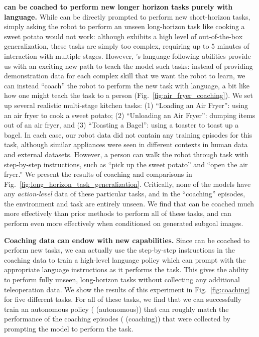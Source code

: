 \noindent \textbf{\MethodName{} can be coached to perform new longer horizon tasks purely with language. }
While \MethodName{} can be directly prompted to perform new short-horizon tasks, simply asking the robot to perform an unseen long-horizon task like cooking a sweet potato would not work: although \MethodName{} exhibits a high level of out-of-the-box generalization, these tasks are simply too complex, requiring up to 5 minutes of interaction with multiple stages. However, \MethodName{}'s language following abilities provide us with an exciting new path to teach the model such tasks: instead of providing demonstration data for each complex skill that we want the robot to learn, we can instead ``coach'' the robot to perform the new task with language, a bit like how one might teach the task to a person (Fig.~\ref{fig:air_fryer_coaching}). We set up several realistic multi-stage kitchen tasks: (1) ``Loading an Air Fryer'': using an air fryer to cook a sweet potato; (2) ``Unloading an Air Fryer'': dumping items out of an air fryer, and (3) ``Toasting a Bagel'': using a toaster to toast up a bagel. In each case, our robot data did not contain any training episodes for this task, although similar appliances were seen in different contexts in human data and external datasets. However, a person can walk the robot through task with step-by-step instructions, such as ``pick up the sweet potato'' and ``open the air fryer.'' We present the results of coaching \MethodName{} and comparisons in Fig.~\ref{fig:long_horizon_task_generalization}. Critically, none of the models have any \emph{action-level} data of these particular tasks, and in the ``coaching'' episodes, the environment and task are entirely unseen. We find that \MethodName{} can be coached much more effectively than prior methods to perform all of these tasks, and can perform even more effectively when conditioned on generated subgoal images.

\noindent \textbf{Coaching data can endow \MethodName{} with new capabilities. }
Since \MethodName{} can be coached to perform new tasks, we can actually use the step-by-step instructions in the coaching data to train a high-level language policy which can prompt \MethodName{} with the appropriate language instructions as it performs the task. This gives \MethodName{} the ability to perform fully unseen, long-horizon tasks without collecting any additional teleoperation data. We show the results of this experiment in Fig.~\ref{fig:coaching} for five different tasks. For all of these tasks, we find that we can successfully train an autonomous policy (\MethodName{} (autonomous)) that can roughly match the performance of the coaching episodes (\MethodName{} (coaching)) that were collected by prompting the model to perform the task.



